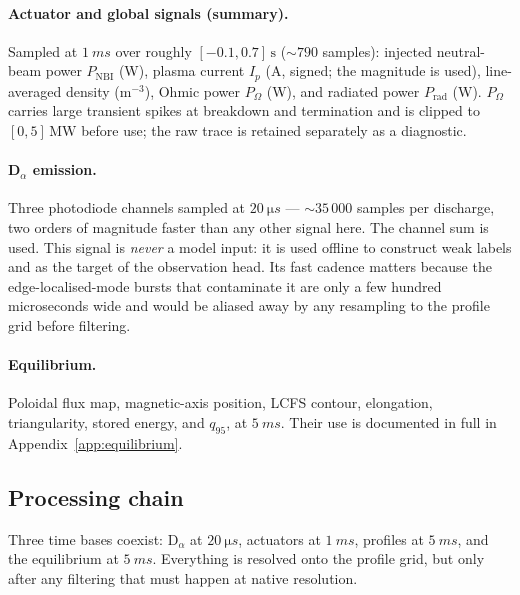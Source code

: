 \paragraph{Actuator and global signals (summary).} Sampled at
$\SI{1}{ms}$ over roughly $[-0.1, 0.7]\,\mathrm{s}$ ($\sim$$790$ samples):
injected neutral-beam power $P_{\mathrm{NBI}}$ (W), plasma current $I_p$
(A, signed; the magnitude is used), line-averaged density (m$^{-3}$),
Ohmic power $P_{\Omega}$ (W), and radiated power $P_{\mathrm{rad}}$ (W).
$P_{\Omega}$ carries large transient spikes at breakdown and termination and
is clipped to $[0, 5]\,\mathrm{MW}$ before use; the raw trace is retained
separately as a diagnostic.

\paragraph{D$_\alpha$ emission.} Three photodiode channels sampled at
$\SI{20}{\micro s}$ --- $\sim$$35\,000$ samples per discharge, two orders of
magnitude faster than any other signal here. The channel sum is used. This
signal is \emph{never} a model input: it is used offline to construct weak
labels and as the target of the observation head. Its fast cadence matters
because the edge-localised-mode bursts that contaminate it are only a few
hundred microseconds wide and would be aliased away by any resampling to the
profile grid before filtering.

\paragraph{Equilibrium.} Poloidal flux map, magnetic-axis position, LCFS
contour, elongation, triangularity, stored energy, and $q_{95}$, at
$\SI{5}{ms}$. Their use is documented in full in
Appendix~\ref{app:equilibrium}.

\subsection{Processing chain}
\label{app:data-processing}

Three time bases coexist: D$_\alpha$ at $\SI{20}{\micro s}$, actuators at
$\SI{1}{ms}$, profiles at $\SI{5}{ms}$, and the equilibrium at $\SI{5}{ms}$.
Everything is resolved onto the profile grid, but only after any filtering
that must happen at native resolution.

